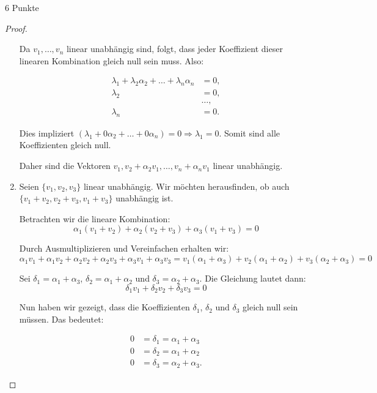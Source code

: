\documentclass{problemset}
\begin{document}
\begin{problem}{6 Punkte}
\begin{proof}
\begin{enumerate}
              Da $v_1, \ldots, v_n$ linear unabhängig sind, folgt, dass jeder
              Koeffizient dieser linearen Kombination gleich null sein muss.
              Also:

              \begin{align*}
                  \lambda_1 + \lambda_2\alpha_2 + \ldots + \lambda_n\alpha_n & = 0,    \\
                  \lambda_2                                                  & = 0,    \\
                                                                             & \ldots, \\
                  \lambda_n                                                  & = 0.
              \end{align*}

              Dies impliziert $(\lambda_1 + 0\alpha_2 + \ldots + 0\alpha_n) = 0
              \Rightarrow \lambda_1 = 0$. Somit sind alle Koeffizienten gleich
              null.

              Daher sind die Vektoren $v_1, v_2 + \alpha_2v_1, \ldots, v_n +
              \alpha_nv_1$ linear unabhängig.

        \item Seien \(\{v_1, v_2, v_3\}\) linear unabhängig. Wir möchten
              herausfinden, ob auch \(\{v_1+v_2, v_2+v_3, v_1+v_3\}\)
              unabhängig ist.

              Betrachten wir die lineare Kombination:
              \[
                  \alpha_1(v_1+v_2) + \alpha_2(v_2+v_3) + \alpha_3(v_1+v_3) = 0
              \]

              Durch Ausmultiplizieren und Vereinfachen erhalten wir:
              \[
                  \alpha_1v_1 + \alpha_1v_2 + \alpha_2v_2 + \alpha_2v_3 + \alpha_3v_1 + \alpha_3v_3 = v_1(\alpha_1+\alpha_3) + v_2(\alpha_1+\alpha_2) + v_3(\alpha_2+\alpha_3) = 0
              \]

              Sei \(\delta_1 = \alpha_1 + \alpha_3\), \(\delta_2 = \alpha_1 +
              \alpha_2\) und \(\delta_3 = \alpha_2 + \alpha_3\). Die Gleichung
              lautet dann:
              \[
                  \delta_1v_1 + \delta_2v_2 + \delta_3v_3 = 0
              \]

              Nun haben wir gezeigt, dass die Koeffizienten \(\delta_1\),
              \(\delta_2\) und \(\delta_3\) gleich null sein müssen. Das
              bedeutet:

              \begin{align*}
                  0 & = \delta_1 = \alpha_1 + \alpha_3  \\
                  0 & = \delta_2 = \alpha_1 + \alpha_2  \\
                  0 & = \delta_3 = \alpha_2 + \alpha_3.
              \end{align*}


\end{enumerate}
\end{proof}
\end{problem}
\end{document}
